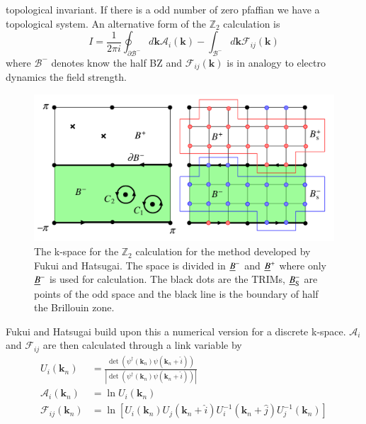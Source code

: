 \documentclass[a4paper,11pt]{report}
\begin{document}
topological invariant. If there is a odd number of zero pfaffian we have a topological system. An alternative form of the $\mathds{Z}_2$ calculation is
\begin{equation}\label{eq:9}
 I = \frac{1}{2\pi i}\oint_{\partial\mathcal{B}^-}d\bm{k}\mathcal{A}_i(\bm{k}) - \int_{\mathcal{B}^-}d\bm{k}\mathcal{F}_{ij}(\bm{k}) 
\end{equation}
where $\mathcal{B}^-$ denotes know the half BZ and $\mathcal{F}_{ij}(\bm{k})$ is in analogy to electro dynamics the field strength.
\begin{figure}[H]
\begin{center}
\includegraphics[scale=0.30]{figures/k-space-z2}
\caption{The k-space for the $\mathds{Z}_2$ calculation for the method developed by Fukui and Hatsugai\cite{Fukui2007}. The space is divided in $\emph{B}^-$  and
 $\emph{B}^+$ where only $\emph{B}^-$ is used for calculation. The black dots are the TRIMs, $\emph{B}_\mathrm{S}^-$ are points of the odd
 space and the black line is the boundary of half the Brillouin zone.}
\label{f:k-space-z2}
\end{center}
\end{figure}
Fukui and Hatsugai\cite{Fukui2007} build upon this a numerical version for a discrete k-space. $\mathcal{A}_i$ and $\mathcal{F}_{ij}$ are then calculated through
a link variable by
\begin{subequations}\label{eq:11}
 \begin{align}
  U_i(\bm{k}_n) &= \frac{\det\left(\psi^\dagger(\bm{k}_n)\psi(\bm{k}_n 
  + \hat{i})\right)}{\left|\det\left(\psi^\dagger(\bm{k}_n)\psi(\bm{k}_n + \hat{i})\right)\right|}\\
  \mathcal{A}_i(\bm{k}_n) &= \ln{U_i(\bm{k}_n)}\\
  \mathcal{F}_{ij}(\bm{k}_n) &= \ln{\left[U_i(\bm{k}_n)U_j(\bm{k}_n + \hat{i})U_i^{-1}(\bm{k}_n + \hat{j})U_j^{-1}(\bm{k}_n)\right]}
 \end{align}
\end{subequations}
\end{document}
